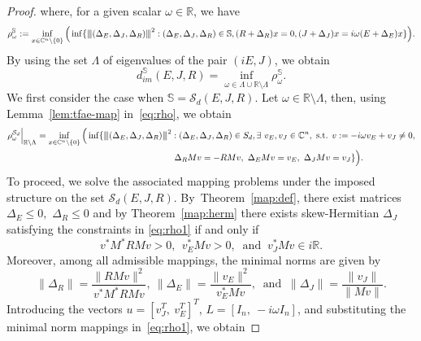 \documentclass[11pt]{article}
\newcommand{\R}{\mathbb R}
\newcommand{\C}{\mathbb C}
\newcommand{\nnrm}[1]{{\left\vert\kern-0.25ex\left\vert\kern-0.25ex\left\vert #1
		\right\vert\kern-0.25ex\right\vert\kern-0.25ex\right\vert}}
\begin{document}
\begin{proof}
    where, for a given scalar $\omega \in \R$, we have
    \begin{align}\label{eq:rho}
        \rho_\omega^{\mathbb S}:=\inf_{x\in \C^{n}\setminus \{0\}}\Big(\inf\{\nnrm{(\Delta_E,\Delta_J,\Delta_R)}^2:(\Delta_E,\Delta_J,\Delta_R)\in \mathbb S,(R+\Delta_R)x=0, (J+\Delta_J)x= i\omega (E+\Delta_E) x\}\Big).
    \end{align}
    By using the set $\Lambda$ of eigenvalues of the pair $(iE,J)$, we obtain
    \begin{equation}\label{eq:dist-im1}
        d_{im}^{\mathbb S}(E,J,R)=\inf_{\omega\in \Lambda \cup \R\setminus\Lambda} \rho_{\omega}^{\mathbb S}.
    \end{equation}
    We first consider the case when $\mathbb S=\mathcal S_d(E,J,R)$. Let $\omega\in \R\setminus\Lambda$, then, using Lemma~\ref{lem:tfae-map} in~\eqref{eq:rho}, we obtain
    \begin{align}
        \rho_\omega^{\mathcal S_d}\Big|_{\R\setminus \Lambda}&= \inf_{x\in \C^{n}\setminus \{0\}}\Big(\inf\{\nnrm{(\Delta_E,\Delta_J,\Delta_R)}^2:(\Delta_E,\Delta_J,\Delta_R)\in S_d,\exists~v_E,v_J\in \C^{n}, \text{ s.t. } v:=-i\omega v_E+v_J\neq 0,\nonumber\\
        & \hspace{5.5cm}\Delta_RM v= -RM v,~\Delta_EM v=v_E,~\Delta_JM v=v_J\} \Big).\label{eq:rho1}
    \end{align}
    To proceed, we solve the associated mapping problems under the imposed structure on the set $\mathcal S_d(E,J,R)$. By~{Theorem~\ref{map:def}}, there exist matrices $\Delta_E\leq 0,$ $\Delta_R\leq 0$ and by Theorem~\ref{map:herm} there exists skew-Hermitian $\Delta_J$ satisfying the constraints in \eqref{eq:rho1} if and only if
    \begin{equation}
        v^*M^*RM v>0,~~ v_E^*M v>0,~ \text{  and }~ v_J^*M v \in i\R.
    \end{equation}
    Moreover, among all admissible mappings, the minimal norms are given by
    \begin{equation}
        \|\Delta_R\|=\frac{\|RMv\|^2}{v^*M^*RM v},~\|\Delta_E\|=\frac{\|v_E\|^2}{v_E^*M v},~\text{ and }~\|\Delta_J\|=\frac{\|v_J\|}{\|M v\|}.
    \end{equation}
    Introducing the vectors $u=[v_J^T,~v_E^T]^T$, $L=[I_n,~-i\omega I_n]$, and substituting the minimal norm mappings in~\eqref{eq:rho1}, we obtain

\end{proof}
\end{document}
